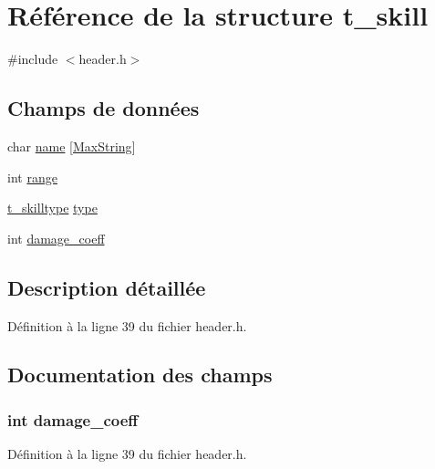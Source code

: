 \hypertarget{structt__skill}{\section{Référence de la structure t\-\_\-skill}
\label{structt__skill}
}


{\ttfamily \#include $<$header.\-h$>$}

\subsection*{Champs de données}
\begin{DoxyCompactItemize}
\item 
char \hyperlink{structt__skill_ab27f28c5ead39031421706ddbbd1edea}{name} \mbox{[}\hyperlink{header_8h_ab154998a3a376095f3601bc35c5cf523}{Max\-String}\mbox{]}
\item 
int \hyperlink{structt__skill_a037e8e370380046bec287bdc96942091}{range}
\item 
\hyperlink{header_8h_a440f669d36bc2028077af38574051204}{t\-\_\-skilltype} \hyperlink{structt__skill_ac00edc3c188c78c47878a357ecff2954}{type}
\item 
int \hyperlink{structt__skill_a9518a5f7d916a01def3588da5dc0c8fa}{damage\-\_\-coeff}
\end{DoxyCompactItemize}


\subsection{Description détaillée}


Définition à la ligne 39 du fichier header.\-h.



\subsection{Documentation des champs}
\hypertarget{structt__skill_a9518a5f7d916a01def3588da5dc0c8fa}{
\subsubsection[{damage\-\_\-coeff}]{\setlength{\rightskip}{0pt plus 5cm}int damage\-\_\-coeff}}\label{structt__skill_a9518a5f7d916a01def3588da5dc0c8fa}


Définition à la ligne 39 du fichier header.\-h.

